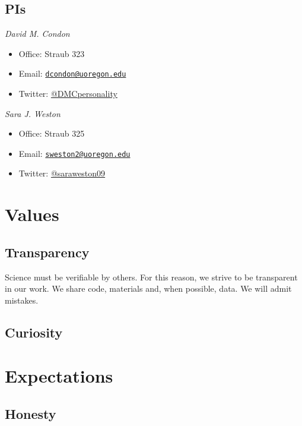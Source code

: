\documentclass[]{book}
\providecommand{\tightlist}{%
  \setlength{\itemsep}{0pt}\setlength{\parskip}{0pt}}
\begin{document}
\hypertarget{pis}{%
\subsection{PIs}\label{pis}}

\emph{David M. Condon}

\begin{itemize}
\tightlist
\item
  Office: Straub 323
\item
  Email: \href{mailto:dcondon@uoregon.edu}{\nolinkurl{dcondon@uoregon.edu}}
\item
  Twitter: \href{https://twitter.com/DMCpersonality}{@DMCpersonality}
\end{itemize}

\emph{Sara J. Weston}

\begin{itemize}
\tightlist
\item
  Office: Straub 325
\item
  Email: \href{mailto:sweston2@uoregon.edu}{\nolinkurl{sweston2@uoregon.edu}}
\item
  Twitter: \href{https://twitter.com/saraweston09}{@saraweston09}
\end{itemize}

\hypertarget{values}{%
\section{Values}\label{values}}

\hypertarget{transparency}{%
\subsection{Transparency}\label{transparency}}

Science must be verifiable by others. For this reason, we strive to be transparent in our work. We share code, materials and, when possible, data. We will admit mistakes.

\hypertarget{curiosity}{%
\subsection{Curiosity}\label{curiosity}}

\hypertarget{expectations}{%
\section{Expectations}\label{expectations}}

\hypertarget{honesty}{%
\subsection{Honesty}\label{honesty}}
\end{document}
